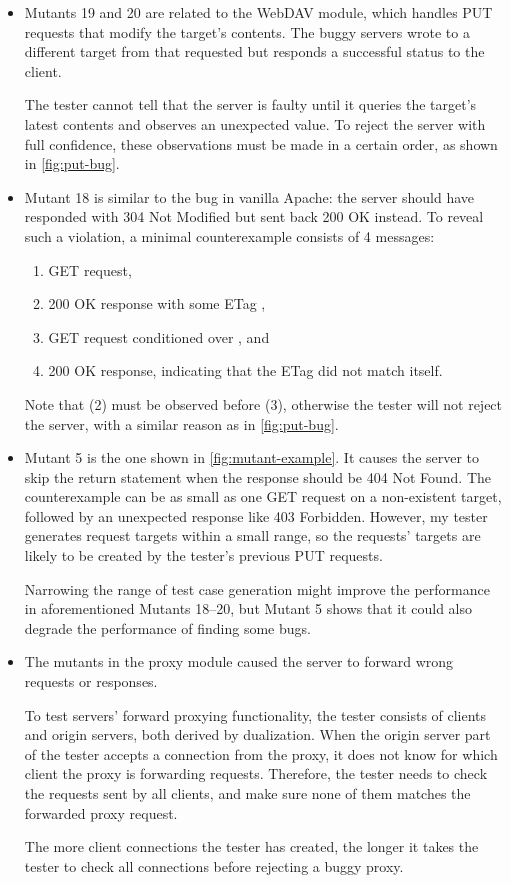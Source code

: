 \begin{itemize}
  \item Mutants 19 and 20 are related to the WebDAV module, which handles PUT
    requests that modify the target's contents.  The buggy servers wrote to a
    different target from that requested but responds a successful status to
    the client.

    The tester cannot tell that the server is faulty until it queries the
    target's latest contents and observes an unexpected value.  To reject the
    server with full confidence, these observations must be made in a certain
    order, as shown in \autoref{fig:put-bug}.

  \item Mutant 18 is similar to the bug in vanilla Apache: the server should
    have responded with 304 Not Modified but sent back 200 OK instead.  To
    reveal such a violation, a minimal counterexample consists of 4 messages:
    \begin{enumerate}
    \item GET request,
    \item 200 OK response with some ETag ,
    \item GET request conditioned over , and
    \item 200 OK response, indicating that the ETag  did not match
      itself.
    \end{enumerate}
    Note that (2) must be observed before (3), otherwise the tester will not
    reject the server, with a similar reason as in \autoref{fig:put-bug}.

  \item Mutant 5 is the one shown in \autoref{fig:mutant-example}.  It causes
    the server to skip the return statement when the response should be 404 Not
    Found.  The counterexample can be as small as one GET request on a
    non-existent target, followed by an unexpected response like 403
    Forbidden.  However, my tester generates request targets within a small
    range, so the requests' targets are likely to be created by the tester's
    previous PUT requests.

    Narrowing the range of test case generation might improve the performance in
    aforementioned Mutants 18--20, but Mutant 5 shows that it could also degrade
    the performance of finding some bugs.

  \item The mutants in the proxy module caused the server to forward wrong
    requests or responses.

    To test servers' forward proxying functionality, the tester consists of
    clients and origin servers, both derived by dualization.  When the origin
    server part of the tester accepts a connection from the proxy, it does not
    know for which client the proxy is forwarding requests.  Therefore, the
    tester needs to check the requests sent by all clients, and make sure none
    of them matches the forwarded proxy request.

    The more client connections the tester has created, the longer it takes the
    tester to check all connections before rejecting a buggy proxy.
\end{itemize}
